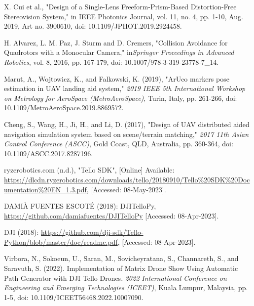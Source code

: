 \begin{flushleft}
\begin{thebibliography}{19}
X. Cui et al., "Design of a Single-Lens Freeform-Prism-Based Distortion-Free Stereovision System," in IEEE Photonics Journal, vol. 11, no. 4, pp. 1-10, Aug. 2019, Art no. 3900610, doi: 10.1109/JPHOT.2019.2924458.


 H. Alvarez, L. M. Paz, J. Sturm and D. Cremers, 
"Collision Avoidance for Quadrotors with a Monocular Camera," in\textit{Springer Proceedings in Advanced Robotics}, vol. 8, 2016, pp. 167-179, doi: 10.1007/978-3-319-23778-7\_14.


Marut, A., Wojtowicz, K., and Falkowski, K. (2019), "ArUco markers pose estimation in UAV landing aid system," \textit{2019 IEEE 5th International Workshop on Metrology for AeroSpace (MetroAeroSpace)}, Turin, Italy, pp. 261-266, doi: 10.1109/MetroAeroSpace.2019.8869572.

Cheng, S., Wang, H., Ji, H., and Li, D. (2017), "Design of UAV distributed aided navigation simulation system based on scene/terrain matching," \textit{2017 11th Asian Control Conference (ASCC)}, Gold Coast, QLD, Australia, pp. 360-364, doi: 10.1109/ASCC.2017.8287196.


ryzerobotics.com (n.d.), "Tello SDK", [Online] Available: \url{https://dlcdn.ryzerobotics.com/downloads/tello/20180910/Tello\%20SDK\%20Documentation\%20EN\_1.3.pdf}, [Accessed: 08-May-2023].

DAMIÀ FUENTES ESCOTÉ (2018): DJITelloPy, \url{https://github.com/damiafuentes/DJITelloPy} [Accessed: 08-Apr-2023].

DJI (2018): \url{https://github.com/dji-sdk/Tello-Python/blob/master/doc/readme.pdf}, [Accessed: 08-Apr-2023].

 Virbora, N., Sokoeun, U., Saran, M., Sovicheyratana, S., Channareth, S., and Saravuth, S. (2022). Implementation of Matrix Drone Show Using Automatic Path Generator with DJI Tello Drones. \textit{2022 International Conference on Engineering and Emerging Technologies (ICEET)}, Kuala Lumpur, Malaysia, pp. 1-5, doi: 10.1109/ICEET56468.2022.10007090.
    

\end{thebibliography}
\end{flushleft}
